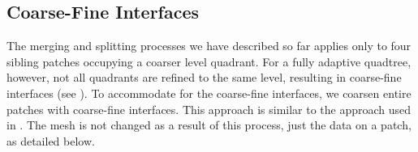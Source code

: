 \subsection{Coarse-Fine Interfaces}
\label{sub:mesh_adaptivity}

The merging and splitting processes we have described so far applies only to four sibling patches occupying a coarser level quadrant. For a fully adaptive quadtree, however, not all quadrants are refined to the same level, resulting in coarse-fine interfaces (see ). To accommodate for the coarse-fine interfaces, we coarsen entire patches with coarse-fine interfaces. This approach is similar to the approach used in \citep{babb2018accelerated}. The mesh is not changed as a result of this process, just the data on a patch, as detailed below.


